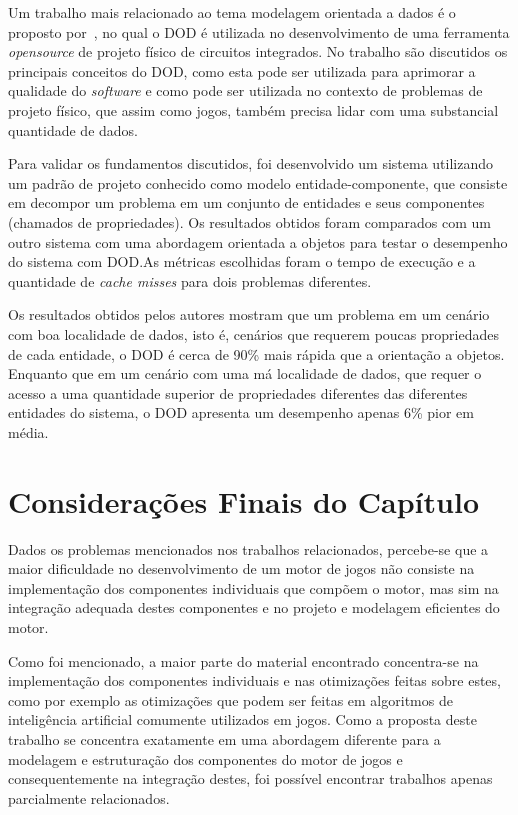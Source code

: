 Um trabalho mais relacionado ao tema modelagem orientada a dados é o proposto 
por~, no qual o DOD é utilizada no desenvolvimento de uma 
ferramenta \textit{opensource} de projeto físico de circuitos integrados. No trabalho 
são discutidos os principais conceitos do DOD, como esta pode ser utilizada para aprimorar 
a qualidade do \textit{software} e como pode ser utilizada no contexto de problemas de 
projeto físico, que assim como jogos, também precisa lidar com uma substancial quantidade 
de dados.

Para validar os fundamentos discutidos, foi desenvolvido um sistema utilizando um padrão de 
projeto conhecido como modelo entidade-componente, que consiste em decompor um problema 
em um conjunto de entidades e seus componentes (chamados de propriedades). Os resultados 
obtidos foram comparados com um outro sistema com uma abordagem orientada a objetos para 
testar o desempenho do sistema com DOD.\@ As métricas escolhidas foram o tempo de execução e 
a quantidade de \textit{cache misses} para dois problemas diferentes. 

Os resultados obtidos pelos autores mostram que um problema em um cenário com boa 
localidade de dados, isto é, cenários que requerem poucas propriedades de cada entidade, o 
DOD é cerca de 90\% mais rápida que a orientação a objetos. Enquanto que em um cenário com 
uma má localidade de dados, que requer o acesso a uma quantidade superior de propriedades 
diferentes das diferentes entidades do sistema, o DOD apresenta um desempenho apenas 6\% 
pior em média.

\section{Considerações Finais do Capítulo}

Dados os problemas mencionados nos trabalhos relacionados, percebe-se que a maior 
dificuldade no desenvolvimento de um motor de jogos não consiste na implementação dos 
componentes individuais que compõem o motor, mas sim na integração adequada destes 
componentes e no projeto e modelagem eficientes do motor. 

Como foi mencionado, a maior parte do material encontrado concentra-se na implementação 
dos componentes individuais e nas otimizações feitas sobre estes, como por exemplo as 
otimizações que podem ser feitas em algoritmos de inteligência artificial comumente 
utilizados em jogos. Como a proposta deste trabalho se concentra exatamente em uma 
abordagem diferente para a modelagem e estruturação dos componentes do motor de jogos 
e consequentemente na integração destes, foi possível encontrar trabalhos apenas 
parcialmente relacionados.


